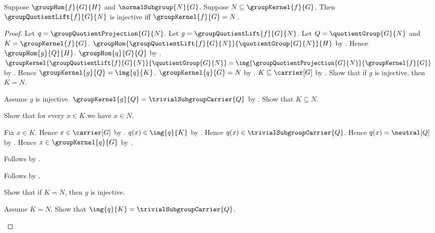 \begin{theorem}\label{group_quotient_lift_injective_iff}
    Suppose $\groupHom{f}{G}{H}$ and $\normalSubgroup{N}{G}$.
    Suppose $N\subseteq\groupKernel{f}{G}$.
    Then $\groupQuotientLift{f}{G}{N}$ is injective iff
        $\groupKernel{f}{G}=N$.
\end{theorem}
\begin{proof}
    Let $q=\groupQuotientProjection{G}{N}$.
    Let $g=\groupQuotientLift{f}{G}{N}$.
    Let $Q=\quotientGroup{G}{N}$ and
        $K=\groupKernel{f}{G}$.
    $\groupHom
        {\groupQuotientLift{f}{G}{N}}
        {\quotientGroup{G}{N}}{H}$ by
        .
    Hence $\groupHom{g}{Q}{H}$.
    $\groupHom{q}{G}{Q}$ by
        .
    $\groupKernel
        {\groupQuotientLift{f}{G}{N}}
        {\quotientGroup{G}{N}}=
        \img{\groupQuotientProjection{G}{N}}
            {\groupKernel{f}{G}}$ by
        .
    Hence $\groupKernel{g}{Q}=\img{q}{K}$.
    $\groupKernel{q}{G}=N$ by
        .
    $K\subseteq\carrier[G]$ by
        .
    Show that if $g$ is injective, then $K=N$.
    \begin{subproof}
        Assume $g$ is injective.
        $\groupKernel{g}{Q}=\trivialSubgroupCarrier{Q}$ by
            .
        Show that $K\subseteq N$.
        \begin{subproof}
            Show that for every $x\in K$ we have $x\in N$.
            \begin{subproof}
                Fix $x\in K$.
                Hence $x\in\carrier[G]$ by
                    .
                $q(x)\in\img{q}{K}$ by
                    .
                Hence $q(x)\in\trivialSubgroupCarrier{Q}$.
                Hence $q(x)=\neutral[Q]$ by
                    .
                Hence $x\in\groupKernel{q}{G}$ by
                    .
            \end{subproof}
            Follows by .
        \end{subproof}
        Follows by .
    \end{subproof}
    Show that if $K=N$, then $g$ is injective.
    \begin{subproof}
        Assume $K=N$.
        Show that $\img{q}{K}=\trivialSubgroupCarrier{Q}$.

\end{subproof}
\end{proof}
